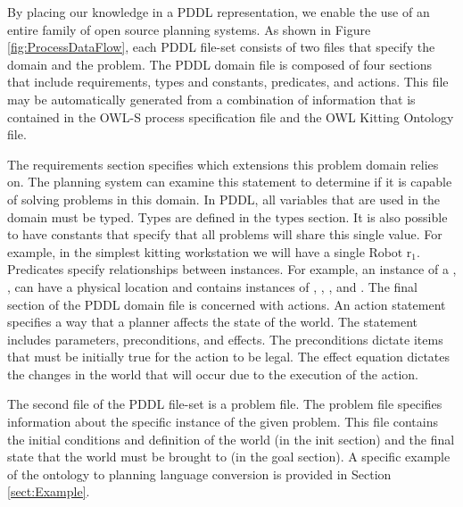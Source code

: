 By placing our knowledge in a PDDL representation, we enable the use of an entire family of open source planning systems.
As shown in Figure \ref{fig:ProcessDataFlow}, each PDDL file-set consists of two files that specify the domain and the problem. The PDDL domain file is composed of four sections that include
requirements, types and constants, predicates, and actions. This file may be automatically generated from a combination of information that is contained in the OWL-S process specification file and the OWL Kitting Ontology file.

The requirements section specifies which extensions this problem domain relies on. The planning system can examine this statement to determine if it is capable of solving problems in this domain. In PDDL, all variables that are used in the domain must be typed. Types are defined in the $\mathrm{types}$ section. It is also possible to have constants that specify that all problems will share this single value. For example, in the simplest kitting workstation we will have a single $\mathrm{Robot}$ $\mathrm{r_1}$.
Predicates specify relationships between instances. For example, an instance of a , , can have a physical location and contains instances of , , , and . The final section of the PDDL domain file is concerned with actions. An action statement specifies a way that a planner affects the state of the world. The statement includes parameters, preconditions, and effects. The preconditions dictate items that must be initially true for the action to be legal. The effect equation dictates the changes in the world that will occur due to the execution of the action.

The second file of the PDDL file-set is a  problem file. The problem file specifies information about the specific instance of the given problem. This file contains the initial conditions and definition of the world (in the init section) and the final state that the world must be brought to (in the goal section). A specific example of the ontology to planning language conversion is provided in Section \ref{sect:Example}.

